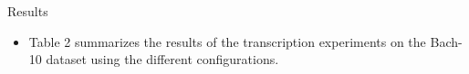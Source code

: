 \documentclass[final]{beamer}
\newlength{\onecolwid}
\newlength{\twocolwid}
\begin{document}
\begin{frame}[t]
\begin{columns}[t]
\begin{column}{\twocolwid}
\begin{columns}[t,totalwidth=\twocolwid]
\begin{column}{\onecolwid}
\begin{block}{Results}
\begin{itemize}
\item Table 2 summarizes the results of the transcription experiments on the Bach-10 dataset using the different configurations.
\end{itemize}

\end{block}



\end{column} %

\end{columns} %










  


\end{column}
\end{columns}
\end{frame}
\end{document}
